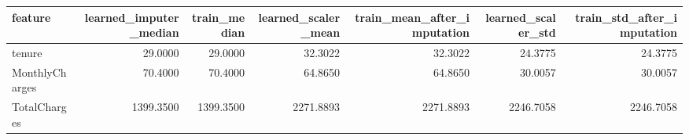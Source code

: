 \begin{tabular}{lrrrrrr}
\toprule
feature & learned\_imputer\_median & train\_median & learned\_scaler\_mean & train\_mean\_after\_imputation & learned\_scaler\_std & train\_std\_after\_imputation \\
\midrule
tenure & 29.0000 & 29.0000 & 32.3022 & 32.3022 & 24.3775 & 24.3775 \\
MonthlyCharges & 70.4000 & 70.4000 & 64.8650 & 64.8650 & 30.0057 & 30.0057 \\
TotalCharges & 1399.3500 & 1399.3500 & 2271.8893 & 2271.8893 & 2246.7058 & 2246.7058 \\
\bottomrule
\end{tabular}
